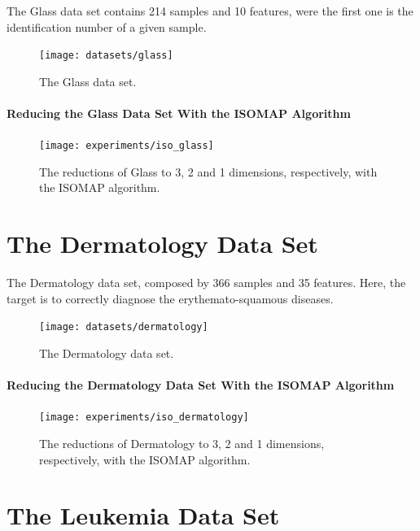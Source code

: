 The Glass data set contains 214 samples and 10 features, were the first one is the identification number of a given sample.

\begin{figure}[H]
	\centering
	\texttt{[image: datasets/glass]}
	\captionsetup{justification=centering}
	\caption{The Glass data set.}
\end{figure}

\newpage
\paragraph{Reducing the Glass Data Set With the ISOMAP Algorithm}

\begin{figure}[H]
	\centering
	\captionsetup{justification=centering}
	\texttt{[image: experiments/iso\_glass]}
	\caption{The reductions of Glass to 3, 2 and 1 dimensions, respectively, with the ISOMAP algorithm.}
	\label{fig:dsglassiso}
\end{figure}

\clearpage
\section{The Dermatology Data Set}

The Dermatology data set, composed by 366 samples and 35 features. Here, the target is to correctly diagnose the erythemato-squamous diseases.

\begin{figure}[H]
	\centering
	\texttt{[image: datasets/dermatology]}
	\captionsetup{justification=centering}
	\caption{The Dermatology data set.}
\end{figure}

\newpage
\paragraph{Reducing the Dermatology Data Set With the ISOMAP Algorithm}

\begin{figure}[H]
	\centering
	\captionsetup{justification=centering}
	\texttt{[image: experiments/iso\_dermatology]}
	\caption{The reductions of Dermatology to 3, 2 and 1 dimensions, respectively, with the ISOMAP algorithm.}
	\label{fig:dsdermatologyiso}
\end{figure}

\clearpage
\section{The Leukemia Data Set}

